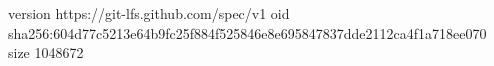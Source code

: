 version https://git-lfs.github.com/spec/v1
oid sha256:604d77c5213e64b9fc25f884f525846e8e695847837dde2112ca4f1a718ee070
size 1048672
